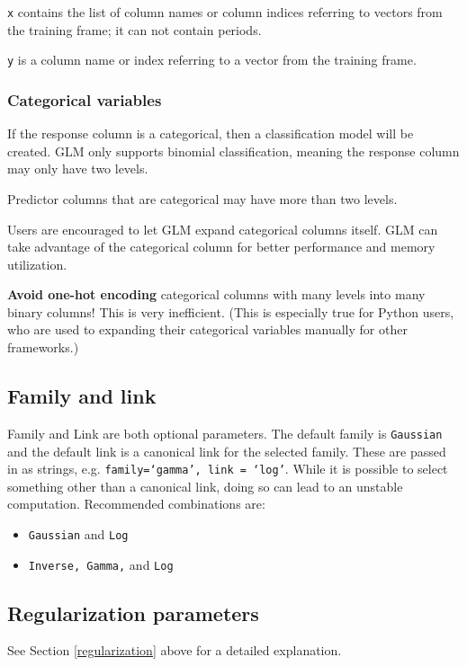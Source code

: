 \texttt{x} contains the list of column names or column indices referring to vectors from the training frame; it can
not contain periods.

\texttt{y} is a column name or index referring to a vector from the training frame.

\subsubsection{Categorical variables}

If the response column is a categorical, then a classification model will be created.  GLM only supports binomial
classification, meaning the response column may only have two levels.

Predictor columns that are categorical may have more than two levels.

Users are encouraged to let GLM expand categorical columns itself.  GLM can take advantage of the categorical
column for better performance and memory utilization.

\textbf{Avoid one-hot encoding} categorical columns with many levels into many binary columns!  This is very
inefficient.  (This is especially true for Python users, who are used to expanding their categorical variables
manually for other frameworks.)

\subsection{Family and link}

Family and Link are both optional parameters. The default family is \texttt{Gaussian} and the default link is a
canonical link for the selected family. These are passed in as strings, e.g. \texttt{family=`gamma', link = `log'}.
While it is possible to select something other than a canonical link, doing so can lead to an unstable
computation. Recommended combinations are:

\begin{itemize}
\item \texttt{Gaussian} and \texttt{Log}
\item \texttt{Inverse, Gamma,} and \texttt{Log}
\end{itemize} 

\subsection{Regularization parameters}

See Section \ref{regularization} above for a detailed explanation.

